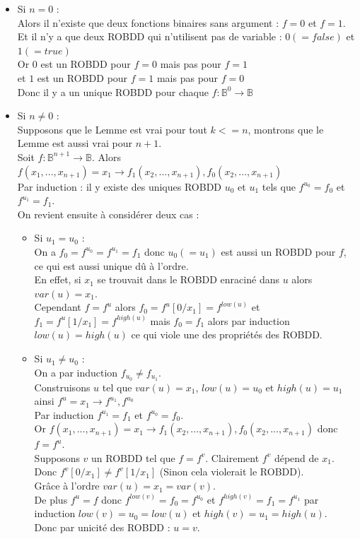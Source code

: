 \documentclass[a4paper, oneside]{report}
\begin{document}
\begin{itemize}
\item Si $n = 0$ : \\
Alors il n'existe que deux fonctions binaires sans argument : $f = 0$ et $f = 1$.\\
Et il n'y a que deux ROBDD qui n'utilisent pas de variable : $0 (= false)$ et $1 (= true)$\\
Or $0$ est un ROBDD pour $f = 0$ mais pas pour $f = 1$ \\
et $1$ est un ROBDD pour $f = 1$ mais pas pour $f = 0$ \\
Donc il y a un unique ROBDD pour chaque $f :\mathbb{B}^0 \to \mathbb{B}$ \\

\item Si $n \neq 0$ :\\
Supposons que le Lemme est vrai pour tout $k <= n$, montrons que le Lemme est aussi vrai pour $n+1$.\\

Soit $f :\mathbb{B}^{n+1} \to \mathbb{B}$.
Alors $f(x_1,...,x_{n+1}) = x_1 \rightarrow f_1(x_2,...,x_{n+1}), f_0(x_2,...,x_{n+1})$\\
Par induction : il y existe des uniques ROBDD $u_0$ et $u_1$ tels que $f^{u_0} = f_0$ et $f^{u_1} = f_1$.\\
On revient ensuite à considérer deux cas :
\begin{itemize}
\item Si $u_1 = u_0$ :\\
On a $f_0 = f^{u_0} = f^{u_1} = f_1$ donc $u_0 (= u_1)$ est aussi un ROBDD pour $f$, ce qui est aussi unique dû à l'ordre.\\
En effet, si $x_1$ se trouvait dans le ROBDD enraciné dans $u$ alors $var(u) = x_1$.\\
Cependant $f = f^u$ alors $f_0 = f^u[0/x_1] = f^{low(u)}$ et $f_1 = f^u[1/x_1] = f^{high(u)}$ mais $f_0 = f_1$ alors par induction $low(u) = high(u)$ ce qui viole une des propriétés des ROBDD.\\

\item Si $u_1 \neq u_0$ :\\
On a par induction $f_{u_0} \neq f_{u_1}$.\\
Construisons $u$ tel que $var(u) = x_1$, $low(u) = u_0$ et $high(u) = u_1$ ainsi $f^u = x_1 \rightarrow f^{u_1}, f^{u_0}$\\
Par induction $f^{u_1} = f_1$ et $f^{u_0} = f_0$.\\
Or $f(x_1,...,x_{n+1}) = x_1 \rightarrow f_1(x_2,...,x_{n+1}), f_0(x_2,...,x_{n+1})$ donc $f = f^u$.\\
Supposons $v$ un ROBDD tel que $f = f^v$. Clairement $f^v$ dépend de $x_1$. Donc $f^v[0/x_1] \neq f^v[1/x_1]$ (Sinon cela violerait le ROBDD).\\
Grâce à l'ordre $var(u) = x_1 = var(v)$.\\
De plus $f^u = f$ donc $f^{low(v)} = f_0 = f^{u_0}$ et $f^{high(v)} = f_1 = f^{u_1}$ par induction $low(v) = u_0 = low(u)$ et $high(v) = u_1 = high(u)$.\\
Donc par unicité des ROBDD : $u = v$.
\end{itemize}
\end{itemize}
\end{document}
